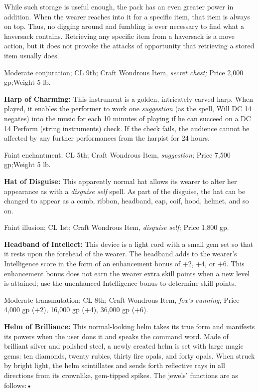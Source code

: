 While such storage is useful enough, the pack has an even greater power in addition. 
When the wearer reaches into it for a specific item, that item is always on top. 
Thus, no digging around and fumbling is ever necessary to find what a haversack 
contains. Retrieving any specific item from a haversack is a move action, but it 
does not provoke the attacks of opportunity that retrieving a stored item usually 
does.

Moderate conjuration; CL 9th; Craft Wondrous Item, \textit{secret chest; }Price 
2,000 gp;Weight 5 lb.

\textbf{Harp of Charming:} This instrument is a golden, intricately carved harp. 
When played, it enables the performer to work one \textit{suggestion }(as the spell, 
Will DC 14 negates) into the music for each 10 minutes of playing if he can succeed 
on a DC 14 Perform (string instruments) check. If the check fails, the audience 
cannot be affected by any further performances from the harpist for 24 hours.

Faint enchantment; CL 5th; Craft Wondrous Item, \textit{suggestion; }Price 7,500 
gp;Weight 5 lb.

\textbf{Hat of Disguise:} This apparently normal hat allows its wearer to alter 
her appearance as with a \textit{disguise self }spell. As part of the disguise, 
the hat can be changed to appear as a comb, ribbon, headband, cap, coif, hood, 
helmet, and so on.

Faint illusion; CL 1st; Craft Wondrous Item, \textit{disguise self; }Price 1,800 
gp.

\textbf{Headband of Intellect:} This device is a light cord with a small gem set 
so that it rests upon the forehead of the wearer. The headband adds to the wearer's 
Intelligence score in the form of an enhancement bonus of +2, +4, or +6. This enhancement 
bonus does not earn the wearer extra skill points when a new level is attained; 
use the unenhanced Intelligence bonus to determine skill points.

Moderate transmutation; CL 8th; Craft Wondrous Item, \textit{fox's cunning; }Price 
4,000 gp (+2), 16,000 gp (+4), 36,000 gp (+6).

\textbf{Helm of Brilliance: }This normal-looking helm takes its true form and manifests 
its powers when the user dons it and speaks the command word. Made of brilliant 
silver and polished steel, a newly created helm is set with large magic gems: ten 
diamonds, twenty rubies, thirty fire opals, and forty opals. When struck by bright 
light, the helm scintillates and sends forth reflective rays in all directions 
from its crownlike, gem-tipped spikes. The jewels' functions are as follows:•

